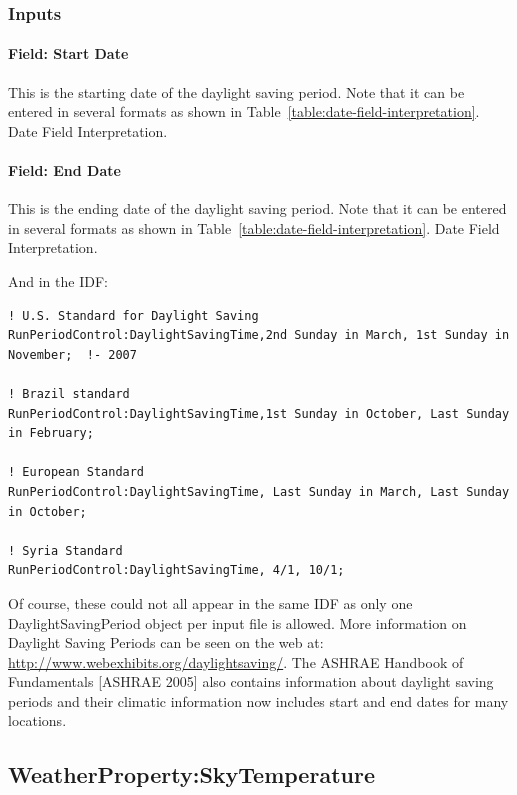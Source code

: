\subsubsection{Inputs}\label{inputs-7-013}

\paragraph{Field: Start Date}\label{field-start-date-1}

This is the starting date of the daylight saving period. Note that it can be entered in several formats as shown in Table~\ref{table:date-field-interpretation}. Date Field Interpretation.

\paragraph{Field: End Date}\label{field-end-date}

This is the ending date of the daylight saving period. Note that it can be entered in several formats as shown in Table~\ref{table:date-field-interpretation}. Date Field Interpretation.

And in the IDF:

\begin{lstlisting}
! U.S. Standard for Daylight Saving
RunPeriodControl:DaylightSavingTime,2nd Sunday in March, 1st Sunday in November;  !- 2007

! Brazil standard
RunPeriodControl:DaylightSavingTime,1st Sunday in October, Last Sunday in February;

! European Standard
RunPeriodControl:DaylightSavingTime, Last Sunday in March, Last Sunday in October;

! Syria Standard
RunPeriodControl:DaylightSavingTime, 4/1, 10/1;
\end{lstlisting}

Of course, these could not all appear in the same IDF as only one DaylightSavingPeriod object per input file is allowed. More information on Daylight Saving Periods can be seen on the web at: \url{http://www.webexhibits.org/daylightsaving/}. The ASHRAE Handbook of Fundamentals {[}ASHRAE 2005{]} also contains information about daylight saving periods and their climatic information now includes start and end dates for many locations.

\subsection{WeatherProperty:SkyTemperature}\label{weatherpropertyskytemperature}

